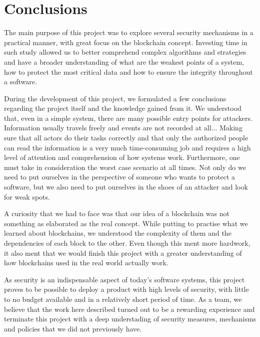 \documentclass[a4paper]{article}
\begin{document}
\newpage
\section{Conclusions} %
\label{sec:conclusions}

The main purpose of this project was to explore several security mechanisms in a practical manner, with great focus on the blockchain concept.
Investing time in such study allowed us to better comprehend complex algorithms and strategies and have a broader understanding of what are the weakest points of a system, how to protect the most critical data and how to ensure the integrity throughout a software.

During the development of this project, we formulated a few conclusions regarding the project itself and the knowledge gained from it.
We understood that, even in a simple system, there are many possible entry points for attackers.
Information usually travels freely and events are not recorded at all... Making sure that all actors do their tasks correctly and that only the authorized people can read the information is a very much time-consuming job and requires a high level of attention and comprehension of how systems work.
Furthermore, one must take in consideration the worst case scenario at all times. 
Not only do we need to put ourselves in the perspective of someone who wants to protect a software, but we also need to put ourselves in the shoes of an attacker and look for weak spots.

A curiosity that we had to face was that our idea of a blockchain was not something as elaborated as the real concept.
While putting to practise what we learned about blockchains, we understood the complexity of them and the dependencies of each block to the other.
Even though this ment more hardwork, it also ment that we would finish this project with a greater understanding of how blockchains used in the real world actually work.

As security is an indispensable aspect of today's software systems, this project proves to be possible to deploy a product with high levels of security, with little to no budget available and in a relatively short period of time.
As a team, we believe that the work here described turned out to be a rewarding experience and terminate this project with a deep understading of security measures, mechanisms and policies that we did not previously have.
\end{document}

